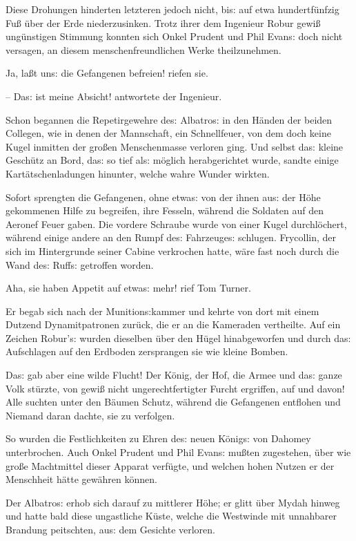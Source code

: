 \documentclass[oneside,12pt]{book}
\newcommand{\s}{s:}
\begin{document}
Diese Drohungen hinderten letzteren jedoch nicht, bi{\s} auf etwa
hundertf\"unfzig Fu{\ss} \"uber der Erde niederzusinken. Trotz ihrer
dem Ingenieur Robur gewi{\ss} ung\"unstigen Stimmung konnten sich
Onkel Prudent und Phil Evan{\s} doch nicht versagen, an diesem
menschenfreundlichen Werke theilzunehmen.

{\glqq}Ja, la{\ss}t un{\s} die Gefangenen befreien! riefen sie.

-- Da{\s} ist meine Absicht!{\grqq} antwortete der Ingenieur.

Schon begannen die Repetirgewehre de{\s} {\glqq}Albatro{\s}{\grqq} in
den H\"anden der beiden Collegen, wie in denen der Mannschaft, ein
Schnellfeuer, von dem doch keine Kugel inmitten der gro{\ss}en
Menschenmasse verloren ging. Und selbst da{\s} kleine Gesch\"utz an
Bord, da{\s} so tief al{\s} m\"oglich herabgerichtet wurde, sandte
einige Kart\"atschenladungen hinunter, welche wahre Wunder wirkten.

Sofort sprengten die Gefangenen, ohne etwa{\s} von der ihnen au{\s}
der H\"ohe gekommenen Hilfe zu begreifen, ihre Fesseln, w\"ahrend die
Soldaten auf den Aeronef Feuer gaben. Die vordere Schraube wurde von
einer Kugel durchl\"ochert, w\"ahrend einige andere an den Rumpf
de{\s} Fahrzeuge{\s} schlugen. Frycollin, der sich im Hintergrunde
seiner Cabine verkrochen hatte, w\"are fast noch durch die Wand
de{\s} Ruff{\s} getroffen worden.

{\glqq}Aha, sie haben Appetit auf etwa{\s} mehr!{\grqq} rief Tom
Turner.

Er begab sich nach der Munition{\s}kammer und kehrte von dort mit
einem Dutzend Dynamitpatronen zur\"uck, die er an die Kameraden
vertheilte. Auf ein Zeichen Robur'{\s} wurden dieselben \"uber den
H\"ugel hinabgeworfen und durch da{\s} Aufschlagen auf den Erdboden
zersprangen sie wie kleine Bomben.

Da{\s} gab aber eine wilde Flucht! Der K\"onig, der Hof, die Armee
und da{\s} ganze Volk st\"urzte, von gewi{\ss} nicht
ungerechtfertigter Furcht ergriffen, auf und davon! Alle suchten
unter den B\"aumen Schutz, w\"ahrend die Gefangenen entflohen und
Niemand daran dachte, sie zu verfolgen.

So wurden die Festlichkeiten zu Ehren de{\s} neuen K\"onig{\s} von
Dahomey unterbrochen. Auch Onkel Prudent und Phil Evan{\s} mu{\ss}ten
zugestehen, \"uber wie gro{\ss}e Machtmittel dieser Apparat
verf\"ugte, und welchen hohen Nutzen er der Menschheit h\"atte
gew\"ahren k\"onnen.

Der {\glqq}Albatro{\s}{\grqq} erhob sich darauf zu mittlerer H\"ohe;
er glitt \"uber Mydah hinweg und hatte bald diese ungastliche
K\"uste, welche die Westwinde mit unnahbarer Brandung peitschten,
au{\s} dem Gesichte verloren.
\end{document}
